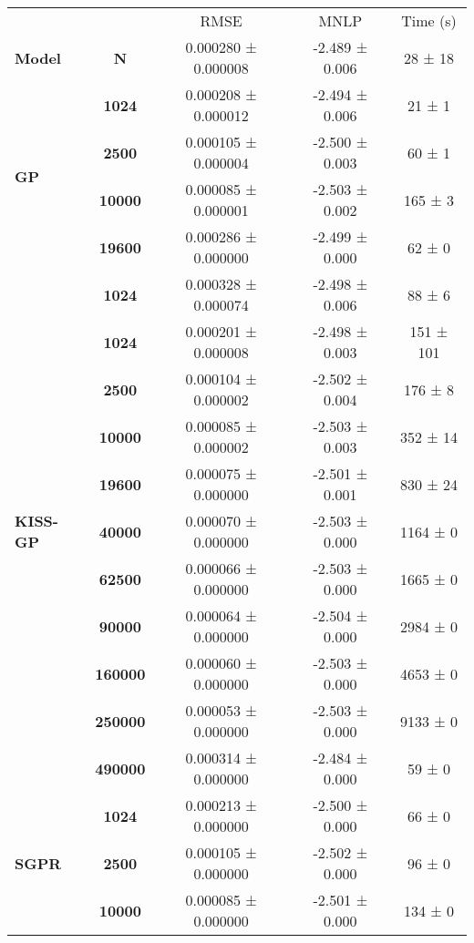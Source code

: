 \begin{tabular}{lcccc}
\toprule
           &        &                 RMSE &            MNLP &   Time (s) \\
\textbf{Model} & \textbf{N} &  0.000280 ± 0.000008 &  -2.489 ± 0.006 &    28 ± 18 \\
\midrule
\multirow{4}{*}{\textbf{GP}} & \textbf{1024  } &  0.000208 ± 0.000012 &  -2.494 ± 0.006 &     21 ± 1 \\
           & \textbf{2500  } &  0.000105 ± 0.000004 &  -2.500 ± 0.003 &     60 ± 1 \\
           & \textbf{10000 } &  0.000085 ± 0.000001 &  -2.503 ± 0.002 &    165 ± 3 \\
           & \textbf{19600 } &  0.000286 ± 0.000000 &  -2.499 ± 0.000 &     62 ± 0 \\
\cline{1-5}
\multirow{11}{*}{\textbf{KISS-GP}} & \textbf{1024  } &  0.000328 ± 0.000074 &  -2.498 ± 0.006 &     88 ± 6 \\
           & \textbf{1024  } &  0.000201 ± 0.000008 &  -2.498 ± 0.003 &  151 ± 101 \\
           & \textbf{2500  } &  0.000104 ± 0.000002 &  -2.502 ± 0.004 &    176 ± 8 \\
           & \textbf{10000 } &  0.000085 ± 0.000002 &  -2.503 ± 0.003 &   352 ± 14 \\
           & \textbf{19600 } &  0.000075 ± 0.000000 &  -2.501 ± 0.001 &   830 ± 24 \\
           & \textbf{40000 } &  0.000070 ± 0.000000 &  -2.503 ± 0.000 &   1164 ± 0 \\
           & \textbf{62500 } &  0.000066 ± 0.000000 &  -2.503 ± 0.000 &   1665 ± 0 \\
           & \textbf{90000 } &  0.000064 ± 0.000000 &  -2.504 ± 0.000 &   2984 ± 0 \\
           & \textbf{160000} &  0.000060 ± 0.000000 &  -2.503 ± 0.000 &   4653 ± 0 \\
           & \textbf{250000} &  0.000053 ± 0.000000 &  -2.503 ± 0.000 &   9133 ± 0 \\
           & \textbf{490000} &  0.000314 ± 0.000000 &  -2.484 ± 0.000 &     59 ± 0 \\
\cline{1-5}
\multirow{8}{*}{\textbf{SGPR}} & \textbf{1024  } &  0.000213 ± 0.000000 &  -2.500 ± 0.000 &     66 ± 0 \\
           & \textbf{2500  } &  0.000105 ± 0.000000 &  -2.502 ± 0.000 &     96 ± 0 \\
           & \textbf{10000 } &  0.000085 ± 0.000000 &  -2.501 ± 0.000 &    134 ± 0 \\

\end{tabular}
